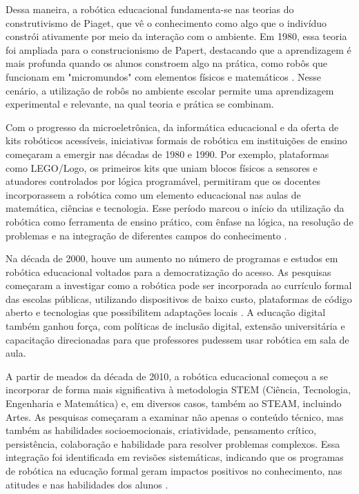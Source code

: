\documentclass[portuguese]{textolivre}
\begin{document}
Dessa maneira, a robótica educacional fundamenta-se nas teorias do construtivismo de Piaget, que vê o conhecimento como algo que o indivíduo constrói ativamente por meio da interação com o ambiente. Em 1980, essa teoria foi ampliada para o construcionismo de Papert, destacando que a aprendizagem é mais profunda quando os alunos constroem algo na prática, como robôs que funcionam em "micromundos" com elementos físicos e matemáticos \cite{ref0}. Nesse cenário, a utilização de robôs no ambiente escolar permite uma aprendizagem experimental e relevante, na qual teoria e prática se combinam.
 
Com o progresso da microeletrônica, da informática educacional e da oferta de kits robóticos acessíveis, iniciativas formais de robótica em instituições de ensino começaram a emergir nas décadas de 1980 e 1990. Por exemplo, plataformas como LEGO/Logo, os primeiros kits que uniam blocos físicos a sensores e atuadores controlados por lógica programável, permitiram que os docentes incorporassem a robótica como um elemento educacional nas aulas de matemática, ciências e tecnologia. Esse período marcou o início da utilização da robótica como ferramenta de ensino prático, com ênfase na lógica, na resolução de problemas e na integração de diferentes campos do conhecimento \cite{ref0,ref10}.

Na década de 2000, houve um aumento no número de programas e estudos em robótica educacional voltados para a democratização do acesso. As pesquisas começaram a investigar como a robótica pode ser incorporada ao currículo formal das escolas públicas, utilizando dispositivos de baixo custo, plataformas de código aberto e tecnologias que possibilitem adaptações locais \cite{ref17,ref16}. A educação digital também ganhou força, com políticas de inclusão digital, extensão universitária e capacitação direcionadas para que professores pudessem usar robótica em sala de aula.

A partir de meados da década de 2010, a robótica educacional começou a se incorporar de forma mais significativa à metodologia STEM (Ciência, Tecnologia, Engenharia e Matemática) e, em diversos casos, também ao STEAM, incluindo Artes. As pesquisas começaram a examinar não apenas o conteúdo técnico, mas também as habilidades socioemocionais, criatividade, pensamento crítico, persistência, colaboração e habilidade para resolver problemas complexos. Essa integração foi identificada em revisões sistemáticas, indicando que os programas de robótica na educação formal geram impactos positivos no conhecimento, nas atitudes e nas habilidades dos alunos \cite{ref16,ref4,ref3}.
\end{document}

